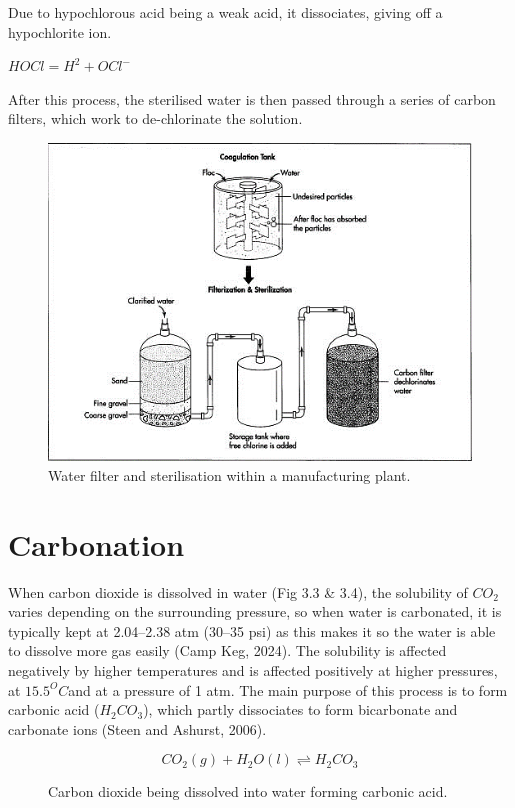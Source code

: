 Due to hypochlorous acid being a weak acid, it dissociates, giving off a hypochlorite ion.

\begin{center}
    \begin{math}
    HOCl = H^{2} + OCl^{-} 
\end{math}
\end{center}


After this process, the sterilised water is then passed through a series of carbon filters, which work to de-chlorinate the solution.
\begin{figure}[htp]
    \centering
    \includegraphics[width=0.5\linewidth]{assets/5.png}
    \caption{Water filter and sterilisation within a manufacturing plant.}
    \label{fig:enter-label}
\end{figure}

\section{Carbonation}
When carbon dioxide is dissolved in water (Fig 3.3 \& 3.4), the solubility of \begin{math}CO_{2}\end{math} varies depending on the surrounding pressure, so when water is carbonated, it is typically kept at 2.04–2.38 atm (30–35 psi) as this makes it so the water is able to dissolve more gas easily (Camp Keg, 2024). The solubility is affected negatively by higher temperatures and is affected positively at higher pressures, at \begin{math}15.5^O C \end{math}and at a pressure of 1 atm. The main purpose of this process is to form carbonic acid (\begin{math}H_{2}CO_{3}\end{math}), which partly dissociates to form bicarbonate and carbonate ions (Steen and Ashurst, 2006). \\

\begin{figure}[htp]
    \centering
    \[
        CO_{2}(g) + H_{2}O(l) \rightleftharpoons H_{2}CO_{3}
    \]
    \caption{Carbon dioxide being dissolved into water forming carbonic acid.}
    \label{fig:enter-label}
\end{figure}

